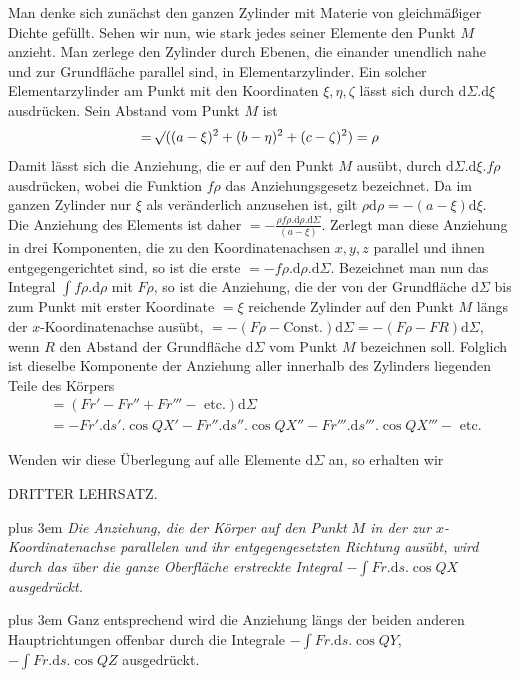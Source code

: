 \par
Man denke sich zunächst den ganzen Zylinder mit Materie von gleichmäßiger Dichte gefüllt. Sehen wir nun, wie stark jedes seiner Elemente den Punkt $M$ anzieht. Man zerlege den Zylinder durch Ebenen, die einander unendlich nahe und zur Grundfläche parallel sind, in Elementarzylinder. Ein solcher Elementarzylinder am Punkt mit den Koordinaten $\xi,\eta,\zeta$ lässt sich durch $\mathrm{d}\Sigma.\mathrm{d}\xi$ ausdrücken. Sein Abstand vom Punkt $M$ ist
\[
=\mathord{{}^{}\!\surd}((a-\xi)^2+(b-\eta)^2+(c-\zeta)^2)=\rho
\]
Damit lässt sich die Anziehung, die er auf den Punkt $M$ ausübt, durch $\mathrm{d}\Sigma.\mathrm{d}\xi.f\rho$ ausdrücken, wobei die Funktion $f\rho$ das Anziehungsgesetz bezeichnet. Da im ganzen Zylinder nur $\xi$ als veränderlich anzusehen ist, gilt $\rho\mathrm{d}\rho=-(a-\xi)\mathrm{d}\xi$. Die Anziehung des Elements ist daher $=-\frac{\rho f\rho.\mathrm{d}\rho.\mathrm{d}\Sigma}{(a-\xi)}$. Zerlegt man diese Anziehung in drei Komponenten, die zu den Koordinatenachsen $x,y,z$ parallel und ihnen entgegengerichtet sind, so ist die erste $=-f\rho.\mathrm{d}\rho.\mathrm{d}\Sigma$. Bezeichnet man nun das Integral $\int f\rho.\mathrm{d}\rho$ mit $F\rho$, so ist die Anziehung, die der von der Grundfläche $\mathrm{d}\Sigma$ bis zum Punkt mit erster Koordinate $=\xi$ reichende Zylinder auf den Punkt $M$ längs der $x$-Koordinatenachse ausübt, $=-(F\rho-\mathrm{Const.})\mathrm{d}\Sigma=-(F\rho-FR)\mathrm{d}\Sigma$, wenn $R$ den Abstand der Grundfläche $\mathrm{d}\Sigma$ vom Punkt $M$ bezeichnen soll. Folglich ist dieselbe Komponente der Anziehung aller innerhalb des Zylinders liegenden Teile des Körpers
\[
\begin{aligned}
&=(Fr'-Fr''+Fr'''-\text{ etc.})\mathrm{d}\Sigma\\
&=-Fr'.\mathrm{d}s'.\cos QX'-Fr''.\mathrm{d}s''.\cos QX''-Fr'''.\mathrm{d}s'''.\cos QX'''-\text{ etc.}
\end{aligned}
\]
\par
Wenden wir diese Überlegung auf alle Elemente $\mathrm{d}\Sigma$ an, so erhalten wir
\par\medskip{}
\begin{center}DRITTER LEHRSATZ.\end{center}
\par
{\rightskip=0pt plus 3em \textit{Die Anziehung, die der Körper auf den Punkt $M$ in der zur $x$-Koordinatenachse parallelen und ihr entgegengesetzten Richtung ausübt, wird durch das über die ganze Oberfläche erstreckte Integral $-\int Fr.\mathrm{d}s.\cos QX$ ausgedrückt.}\par}
\par
{\rightskip=0pt plus 3em Ganz entsprechend wird die Anziehung längs der beiden anderen Hauptrichtungen offenbar durch die Integrale $-\int Fr.\mathrm{d}s.\cos QY$, $-\int Fr.\mathrm{d}s.\cos QZ$ ausgedrückt.\par}

